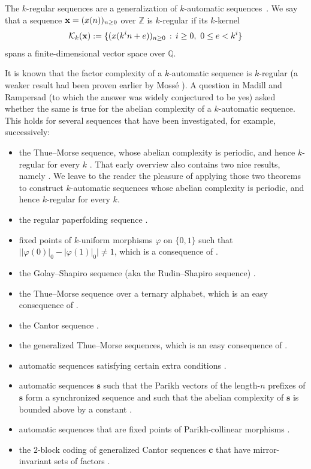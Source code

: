 \documentclass[12pt]{article}
\theoremstyle{plain}
\theoremstyle{definition}
\theoremstyle{remark}
\newcommand{\Z}{\mathbb{Z}}
\newcommand{\Q}{\mathbb{Q}}
\numberwithin{equation}{section}
\newcommand{\kernel}{\mathcal{K}}
\def\suchthat{\, : \,}
\begin{document}
\medskip

The $k$-regular sequences are a generalization of $k$-automatic 
sequences~\cite{AlloucheShallit,Allouche&Shallit:2003}.  We say that a sequence
${\bf x} = (x(n))_{n \geq 0}$ over $\Z$ is 
$k$-regular if its $k$-kernel
$$
\kernel_k ({\bf x}) := \{ (x(k^i n + e))_{n \geq 0} \suchthat
i \geq 0, \ 0 \leq e < k^i \}
$$
spans a finite-dimensional vector space over $\Q$.  

\medskip

It is known that the factor complexity of a $k$-automatic 
sequence is $k$-regular \cite[Prop.~4.3]{Carpi-D-Alonzo}
(a weaker result had been proven earlier by Moss\'e \cite{Mosse}).
A question in Madill and Rampersad \cite{MadillRampersad} (to which the answer 
was widely conjectured to be yes) asked whether the same 
is true for the abelian complexity of a $k$-automatic 
sequence.  
This holds for several sequences that 
have been investigated, for example, successively:
\begin{itemize}
    \item the Thue--Morse sequence, whose abelian complexity is periodic, and hence $k$-regular for every $k$ 
    \cite[Thm.~3.1]{Richomme&Saari&Zamboni:2011}. That
    early overview also contains two nice results, namely
    \cite[Thm.~1.7 and Thm.~3.3]{Richomme&Saari&Zamboni:2011}. We leave to the reader the
    pleasure of applying those two theorems to construct
    $k$-automatic sequences whose abelian complexity is
    periodic, and hence $k$-regular for every $k$.
    \item the regular paperfolding sequence \cite{MadillRampersad}.
    \item fixed points of $k$-uniform morphisms 
    $\varphi$ on $\{0, 1\}$ such that 
    $\big|\lvert\varphi(0)\rvert_0 - \lvert\varphi(1)\rvert_0\big|\neq 1$, which is a consequence of \cite[Cor.~1]{BSSW}.
    \item the Golay--Shapiro sequence (aka the Rudin--Shapiro sequence) \cite{LCWW}.
    \item the Thue--Morse sequence over a ternary alphabet, which is an easy consequence of \cite[Thm.~4.1]{KaboreKentiega}.
    \item the Cantor sequence \cite[Thm.~2]{CLW}.
    \item the generalized Thue--Morse sequences, which is an easy consequence of \cite[Cor.~1]{ChenWen}.
    \item automatic sequences satisfying certain extra conditions
    \cite[Thm.~2]{ChenWen}.
    \item automatic sequences $\mathbf{s}$ such that
    the Parikh vectors of the length-$n$ prefixes of $\mathbf{s}$ 
    form a synchronized sequence and such that the abelian
    complexity of $\mathbf{s}$ is bounded above by a constant \cite{Shallit2021}.
    \item automatic sequences that are fixed points of Parikh-collinear morphisms \cite[Thm.~3]{Rigo&Stipulanti&Whiteland:2024}.
    \item the $2$-block coding of generalized Cantor 
    sequences $\mathbf{c}$ that have mirror-invariant sets of 
    factors \cite[Thm.~1]{LCW}.
    \end{itemize}
\end{document}
